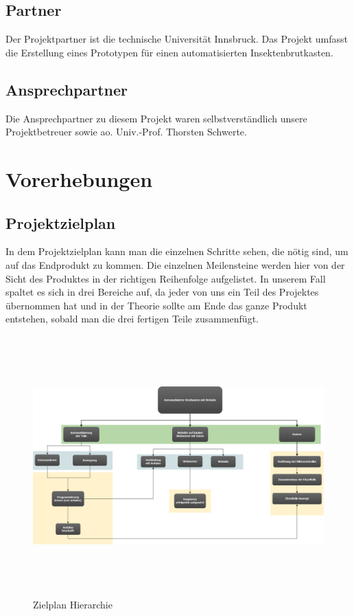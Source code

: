 \subsection{Partner}
Der Projektpartner ist die technische Universität Innsbruck. Das Projekt umfasst die Erstellung eines Prototypen für einen automatisierten Insektenbrutkasten.


\subsection{Ansprechpartner}
Die Ansprechpartner zu diesem Projekt waren selbstverständlich unsere Projektbetreuer sowie ao. Univ.-Prof. Thorsten Schwerte.




\section{Vorerhebungen}

\def \currentAuthor{Kevin Glatz}
\subsection{Projektzielplan}

In dem Projektzielplan kann man die einzelnen Schritte sehen, die nötig sind, um auf das Endprodukt zu kommen. Die einzelnen Meilensteine werden hier von der Sicht des Produktes in der richtigen Reihenfolge aufgelistet. In unserem Fall spaltet es sich in drei Bereiche auf, da jeder von uns ein Teil des Projektes übernommen hat und in der Theorie sollte am Ende das ganze Produkt entstehen, sobald man die drei fertigen Teile zusammenfügt. 

\begin{figure}
\includegraphics[height=10cm,angle=90]{figures/Zielhierachie}
\caption{Zielplan Hierarchie}
\end{figure}


